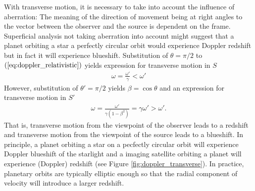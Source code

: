 \documentclass [12pt, a4paper] {article}
\begin{document}
With transverse motion, it is necessary to take into account the influence of
aberration: The meaning of the direction of movement being at right angles to 
the vector between the observer and the source is dependent on the frame. 
Superficial analysis not taking aberration into account might suggest that a 
planet orbiting a star a perfectly circular orbit would experience Doppler 
redshift but in fact it will experience blueshift.
Substitution of $\theta = \pi/2$ to $(\ref{eq:doppler_relativistic})$ yields 
expression for transverse motion in $S$
\begin {eqnarray}
    \omega = \frac{\omega'}{\gamma} < \omega'
\end {eqnarray}
However, substitution of $\theta' = \pi/2$ yields $\beta = \cos\theta$ and 
an expression for transverse motion in $S'$
\begin {eqnarray}
    \omega = \frac{\omega'}{\gamma(1 - \beta^2)} = \gamma\omega' > \omega'.
\end {eqnarray}
That is, transverse motion from the viewpoint of the observer leads to a 
redshift and transverse motion from the viewpoint of the source leads to 
a blueshift. In principle, a planet orbiting a star on a pecfectly circular 
orbit will experience Doppler blueshift of the starlight and a imaging 
satellite orbiting a planet will experience (Doppler) redshift (see 
Figure \ref{fig:doppler_transverse}). In practice, planetary orbits are 
typically elliptic enough so that the radial component of velocity 
will introduce a larger redshift.
\end{document}
